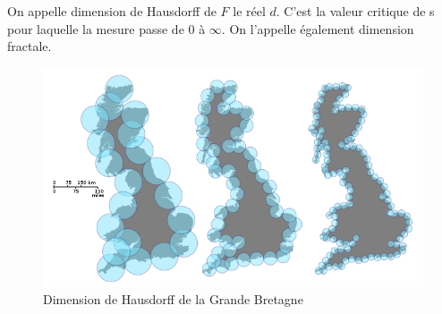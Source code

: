 On appelle dimension de Hausdorff de $F$ le réel $d$. C'est la valeur critique de s pour laquelle la mesure passe de $0$ à $\infty$.
On l'appelle également dimension fractale. 

\begin{figure}[H]
\centering
\includegraphics[scale=0.5]{images/hausdorff.png}
\caption{Dimension de Hausdorff de la Grande Bretagne }
\end{figure}


